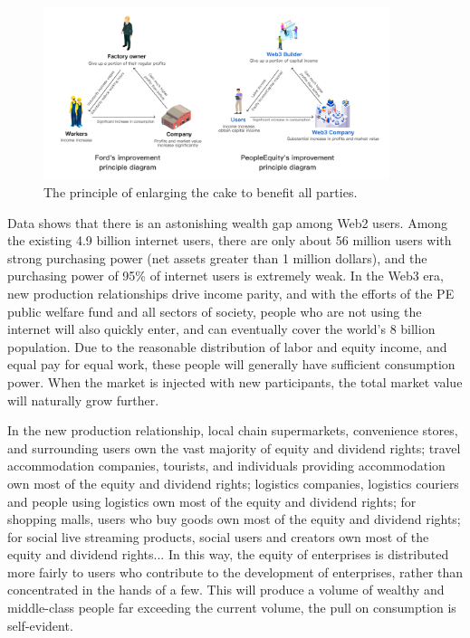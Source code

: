 \documentclass{article}
\begin{document}
\begin{figure}
\centering
\includegraphics[width=0.9\textwidth]{./img/enlarging_the_cake.png}
\caption{\label{fig}The principle of enlarging the cake to benefit all parties.}
\end{figure}

Data shows that there is an astonishing wealth gap among Web2 users. Among the existing 4.9 billion internet users, there are only about 56 million users with strong purchasing power (net assets greater than 1 million dollars), and the purchasing power of 95\% of internet users is extremely weak. In the Web3 era, new production relationships drive income parity, and with the efforts of the PE public welfare fund and all sectors of society, people who are not using the internet will also quickly enter, and can eventually cover the world's 8 billion population. Due to the reasonable distribution of labor and equity income, and equal pay for equal work, these people will generally have sufficient consumption power. When the market is injected with new participants, the total market value will naturally grow further.

In the new production relationship, local chain supermarkets, convenience stores, and surrounding users own the vast majority of equity and dividend rights; travel accommodation companies, tourists, and individuals providing accommodation own most of the equity and dividend rights; logistics companies, logistics couriers and people using logistics own most of the equity and dividend rights; for shopping malls, users who buy goods own most of the equity and dividend rights; for social live streaming products, social users and creators own most of the equity and dividend rights... In this way, the equity of enterprises is distributed more fairly to users who contribute to the development of enterprises, rather than concentrated in the hands of a few. This will produce a volume of wealthy and middle-class people far exceeding the current volume, the pull on consumption is self-evident.
\end{document}
